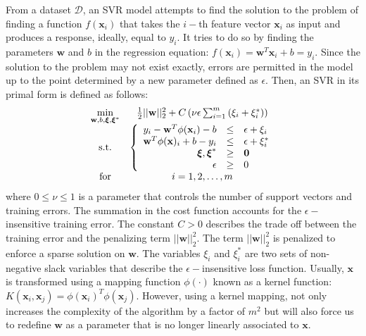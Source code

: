 \documentclass{bmcart}
\begin{document}
From a dataset $\mathcal{D}$, an SVR model attempts to find the solution 
to the problem of finding a function
$f(\mathbf{x}_i)$ that takes the $i-$th feature vector $\mathbf{x}_i$ 
as input and produces
a response, ideally, equal to $y_i$. It tries to do so by finding the parameters
$\mathbf{w}$ and $b$ in the regression equation: $f(\mathbf{x}_i) = 
\mathbf{w}^T\mathbf{x}_i+b=y_i$. Since the solution to the problem may not
exist exactly, errors are permitted in the model up to the point determined by
a new parameter defined as $\epsilon$. Then, an SVR in its primal form 
is defined as follows:
\begin{align}
\begin{array}[t]{cc}
\displaystyle \min_{\mathbf{w},b,\boldsymbol\xi,\boldsymbol\xi^\ast} &
\frac{1}{2}||\mathbf{w}||^2_2 + C \left( \nu\epsilon \sum_{i=1}^{m} 
\left( \xi_i + \xi^\ast_i \right) \right) \label{eq:SVRprimal} \\
  \text{s.t.} & \left\{ \begin{array}{rcl}
    y_i-\mathbf{w}^T \phi(\mathbf{x}_i) - b & \leq & \epsilon + \xi_i  \\
    \mathbf{w}^T \phi(\mathbf{x})_i+b-y_i & \leq & \epsilon + \xi^\ast _i \\
    \boldsymbol\xi,\boldsymbol\xi^\ast & \geq & \mathbf{0} \\
    \epsilon & \geq & 0
                  \end{array} \right. \\
\text{for} & i = 1,2,\dots, m 
\end{array} 
\end{align}
where $0 \leq \nu \leq 1$ is a parameter that controls the number of support
vectors and training errors. The summation in the cost function accounts for the
$\epsilon-$insensitive training error. The
constant $C>0$ describes the trade off between the training error and the
penalizing term $||\mathbf{w}||^2 _2$. The term $||\mathbf{w}||^2 _2$ is
penalized to enforce a sparse solution on $\mathbf{w}$.  The variables $\xi_i$
and $\xi_i^\ast$ are two sets of non-negative slack variables that describe the
$\epsilon-$insensitive loss function. Usually, $\mathbf{x}$ is transformed
using a mapping function $\phi(\cdot)$ known as a kernel function:
$K(\mathbf{x}_i,\mathbf{x}_j)=\phi(\mathbf{x}_i)^T\phi(\mathbf{x}_j)$. However,
using a kernel mapping, not only increases the complexity of the algorithm by a
factor of $m^2$ but will also force us to redefine $\mathbf{w}$ as a parameter
that is no longer linearly associated to $\mathbf{x}$. 
\end{document}
